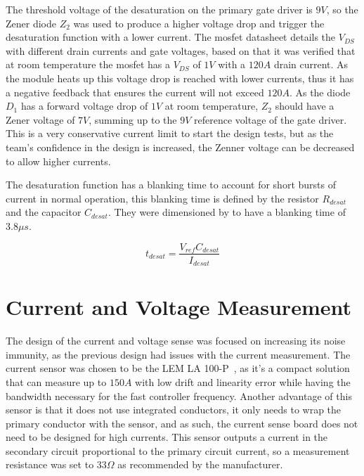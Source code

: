 The threshold voltage of the desaturation on the primary gate driver is $9V$, so the Zener diode $Z_2$ was used to produce a higher voltage drop and trigger the desaturation function with a lower current. The \gls{mosfet} datasheet details the $V_{DS}$ with different drain currents and gate voltages, based on that it was verified that at room temperature the \gls{mosfet} has a $V_{DS}$ of $1V$ with a $120A$ drain current. As the module heats up this voltage drop is reached with lower currents, thus it has a negative feedback that ensures the current will not exceed $120A$. As the diode $D_1$ has a forward voltage drop of $1V$ at room temperature, $Z_2$ should have a Zener voltage of $7V$, summing up to the $9V$ reference voltage of the gate driver. This is a very conservative current limit to start the design tests, but as the team's confidence in the design is increased, the Zenner voltage can be decreased to allow higher currents. 

The desaturation function has a blanking time to account for short bursts of current in normal operation, this blanking time is defined by the resistor $R_{desat}$ and the capacitor $C_{desat}$. They were dimensioned by  to have a blanking time of $3.8\mu s$. 

\begin {equation}
	t_{desat} = \frac{V_{ref} C_{desat}}{I_{desat}}
	\label{eq:desat_time}
\end{equation}
\section{Current and Voltage Measurement}

The design of the current and voltage sense was focused on increasing its noise immunity, as the previous design had issues with the current measurement. The current sensor was chosen to be the LEM LA 100-P~\cite{LEM:Current_sensor_datahseet:2018}, as it's a compact solution that can measure up to $150A$ with low drift and linearity error while having the bandwidth necessary for the fast controller frequency. Another advantage of this sensor is that it does not use integrated conductors, it only needs to wrap the primary conductor with the sensor, and as such, the current sense board does not need to be designed for high currents. This sensor outputs a current in the secondary circuit proportional to the primary circuit current, so a measurement resistance was set to $33\Omega$ as recommended by the manufacturer.

